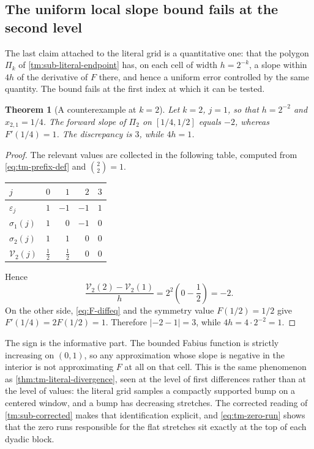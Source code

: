 \documentclass[11pt,oneside]{article}
\newtheorem{theorem}{Theorem}[section]
\theoremstyle{definition}
\theoremstyle{remark}
\begin{document}
\subsection{The uniform local slope bound fails at the second level}
\label{tm:sub-local-slope}

The last claim attached to the literal grid is a quantitative one: that the polygon $\Pi_k$
of \cref{tm:sub-literal-endpoint} has, on each cell of width $h=2^{-k}$, a slope within
$4h$ of the derivative of $F$ there, and hence a uniform error controlled by the same
quantity.  The bound fails at the first index at which it can be tested.

\begin{theorem}[A counterexample at $k=2$]
\label{thm:tm-slope-failure}
Let $k=2$, $j=1$, so that $h=2^{-2}$ and $x_{2,1}=1/4$.  The forward slope of $\Pi_2$ on
$[1/4,1/2]$ equals $-2$, whereas $F'(1/4)=1$.  The discrepancy is $3$, while $4h=1$.
\end{theorem}

\begin{proof}
The relevant values are collected in the following table, computed from
\eqref{eq:tm-prefix-def} and $\binom22=1$.

\begin{center}
\begin{tabular}{lrrrr}
\toprule
$j$ & $0$ & $1$ & $2$ & $3$\\
\midrule
$\varepsilon_j$      & $1$ & $-1$ & $-1$ & $1$\\
$\sigma_1(j)$        & $1$ & $0$  & $-1$ & $0$\\
$\sigma_2(j)$        & $1$ & $1$  & $0$  & $0$\\
$\mathcal V_2(j)$    & $\tfrac12$ & $\tfrac12$ & $0$ & $0$\\
\bottomrule
\end{tabular}
\end{center}

Hence
\begin{equation}
 \frac{\mathcal V_2(2)-\mathcal V_2(1)}{h}
 =2^2\left(0-\frac12\right)=-2 .                           \label{eq:tm-slope}
\end{equation}
On the other side, \eqref{eq:F-diffeq} and the symmetry value $F(1/2)=1/2$ give
$F'(1/4)=2F(1/2)=1$.  Therefore $|-2-1|=3$, while $4h=4\cdot2^{-2}=1$.
\end{proof}

The sign is the informative part.  The bounded Fabius function is strictly increasing on
$(0,1)$, so any approximation whose slope is negative in the interior is not approximating
$F$ at all on that cell.  This is the same phenomenon as
\cref{thm:tm-literal-divergence}, seen at the level of first differences rather than at the
level of values: the literal grid samples a compactly supported bump on a centered window,
and a bump has decreasing stretches.  The
corrected reading of \cref{tm:sub-corrected} makes that identification explicit, and
\eqref{eq:tm-zero-run} shows that the zero runs responsible for the flat stretches sit
exactly at the top of each dyadic block.
\end{document}
